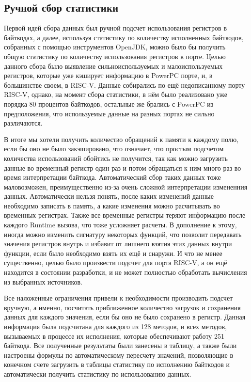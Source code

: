 \subsection{Ручной сбор статистики}

Первой идей сбора данных был ручной подсчет использования регистров в байткодах, а далее, используя статистику по количеству исполненных байткодов, собранных с помощью инструментов OpenJDK, можно было бы получить общую статистику по количеству использования регистров в порте. Целью данного сбора было выявление сильноиспользуемых и малоиспользуемых регистров, которые уже кэширует информацию в PowerPC порте, и, в большинстве своем, в RISC-V. Данные собирались по ещё недописанному порту RISC-V, однако, на момент сбора статистики, в нём было реализовано уже порядка 80 процентов байткодов, остальные же брались с PowerPC из предположения, что используемые данные на разных портах не сильно различаются.

В итоге мы хотели получить количество обращений к памяти к каждому полю, если бы оно не было закэшировано, что означает, что простым подсчетом количества использований обойтись не получится, так как можно загрузить данные во временный регистр один раз и потом обращаться к ним много раз во время интерпретации байткода. Автоматический сбор таких данных тоже маловозможен, преимущественно из-за очень сложной интерпретации измененния данных. Автоматически нельзя понять, после каких изменений данные необходимо записать в память, а какие изменения можно расчитывать во временных регистрах. Также все временные регистры теряют информацию после каждого Runtime вызова, что тоже усложняет расчеты. В дополнение к этому, иногда можно изменить сигнатуру некоторых функций, что позволит передавать значения регистров внутрь и избавит от лишнего взятия этих данных внутри функции, если было необходимо взять их ещё и снаружи. И что не менее существенно, целью было произвести подсчет для порта RISC-V, а он ещё находится в состоянии разработки, и не может полностью обработать вычисления из выбранных источников. 

Все наложенные ограничения привели к необходимости производить подсчет вручную, а именно, посчитать приближенное количество загрузок и сохранения данных для каждого значения, если бы оно не было сохранено в регистр. Данная информация была подсчитана для каждого из 128 методов, и всех методов, вызываемых в процессе их исполнения, которые обеспечивают работу 251 байткода. Все полученные результаты были занесены в таблицу, а также были настроены формулы по автоматическому пересчету значений, позволяющие в конечном счете загрузить в таблицы статистику по исполнению байткодов и автоматически получить статистику по использованию данных.

